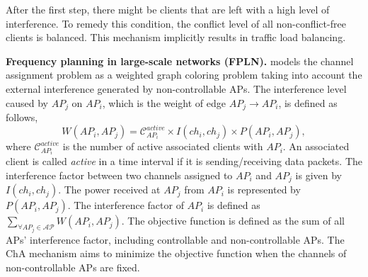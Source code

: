 After the first step, there might be clients that are left with a high level of interference.
To remedy this condition, the conflict level of all non-conflict-free clients is balanced.
This mechanism implicitly results in traffic load balancing.



\label{FPLN}
\textbf{Frequency planning in large-scale networks (FPLN).}
\cite{CAPWAP-based-CA-11} models the channel assignment problem as a weighted graph coloring problem taking into account the external interference generated by non-controllable APs. 
The interference level caused by $AP_{j}$ on $AP_{i}$, which is the weight of edge $AP_{j} \rightarrow AP_{i}$, is defined as follows,
%
\begin{equation}
W(AP_{i},AP_{j})= \mathcal{C}^{active}_{AP_{i}}  \times I(ch_i,ch_j) \times P(AP_{i},AP_{j}),
\end{equation}
where $\mathcal{C}^{active}_{AP_{i}} $ is the number of active associated clients with $AP_{i}$. 
An associated client is called \textit{active} in a time interval if it is sending/receiving data packets.
%
The interference factor between two channels assigned to $AP_{i}$ and $AP_{j}$ is given by $I(ch_i,ch_j)$. 
The power received at $AP_{j}$ from $AP_{i}$ is represented by $P(AP_{i},AP_{j})$. 
The interference factor of $AP_{i}$ is defined as $\sum_{\forall AP_{j} \in \mathcal{AP}}W(AP_{i},AP_{j})$.
The objective function is defined as the sum of all APs' interference factor, including controllable and non-controllable APs. 
The ChA mechanism aims to minimize the objective function when the channels of non-controllable APs are fixed.

